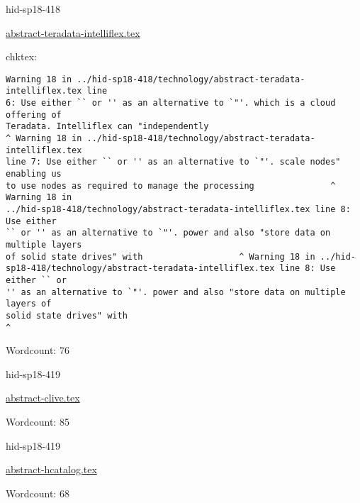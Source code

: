 \begin{IU}

hid-sp18-418

\href{https://github.com/cloudmesh-community/hid-sp18-418/blob/master//technology/abstract-teradata-intelliflex.tex}{abstract-teradata-intelliflex.tex}

 
chktex:
\begin{tiny}
\begin{verbatim}
Warning 18 in ../hid-sp18-418/technology/abstract-teradata-intelliflex.tex line
6: Use either `` or '' as an alternative to `"'. which is a cloud offering of
Teradata. Intelliflex can "independently
^ Warning 18 in ../hid-sp18-418/technology/abstract-teradata-intelliflex.tex
line 7: Use either `` or '' as an alternative to `"'. scale nodes" enabling us
to use nodes as required to manage the processing               ^ Warning 18 in
../hid-sp18-418/technology/abstract-teradata-intelliflex.tex line 8: Use either
`` or '' as an alternative to `"'. power and also "store data on multiple layers
of solid state drives" with                   ^ Warning 18 in ../hid-
sp18-418/technology/abstract-teradata-intelliflex.tex line 8: Use either `` or
'' as an alternative to `"'. power and also "store data on multiple layers of
solid state drives" with
^
\end{verbatim}
\end{tiny}

Wordcount: 76

\end{IU}



\begin{IU}

hid-sp18-419

\href{https://github.com/cloudmesh-community/hid-sp18-419/blob/master//technology/abstract-clive.tex}{abstract-clive.tex}

 

Wordcount: 85

\end{IU}



\begin{IU}

hid-sp18-419

\href{https://github.com/cloudmesh-community/hid-sp18-419/blob/master//technology/abstract-hcatalog.tex}{abstract-hcatalog.tex}

 

Wordcount: 68

\end{IU}

